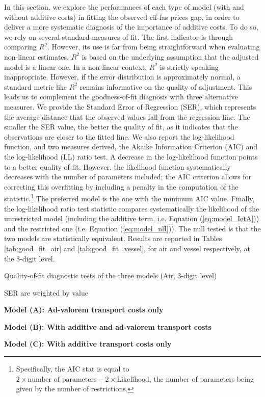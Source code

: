 \documentclass[a4paper,11pt]{article}
\begin{document}
In this section, we explore the performances of each type of model (with and without additive costs) in fitting the observed cif-fas prices gap, in order to deliver a more systematic diagnosis of the importance of additive costs.
To do so, we rely on several standard measures of fit.
The first indicator is through comparing $R^{2}$.
However, its use is far from being straightforward when evaluating non-linear estimates.
$R^2$ is based on the underlying assumption that the adjusted model is a linear one.
In a non-linear context, $R^2$ is strictly speaking inappropriate.
However, if the error distribution is approximately normal, a standard metric like $R^2$ remains informative on the quality of adjustment.
This leads us to complement the goodness-of-fit diagnosis with three alternative measures.
We provide the Standard Error of Regression (SER), which represents the average distance that the observed values fall from the regression line.
The smaller the SER value, the better the quality of fit, as it indicates that the observations are closer to the fitted line.
We also report the log-likelihood function, and two measures derived, the Akaike Information Criterion (AIC) and the log-likelihood (LL) ratio test.
A decrease in the log-likelihood function points to a better quality of fit.
However, the likelihood function systematically decreases with the number of parameters included; the AIC criterion allows for correcting this overfitting by including a penalty in the computation of the statistic.\footnote{Specifically, the AIC stat is equal to $2 \times \textrm{number of parameters} - 2 \times \textrm{Likelihood} $, the number of parameters being given by the number of restrictions.}
The preferred model is the one with the minimum AIC value.
Finally, the log-likelihood ratio test statistic compares systematically the likelihood of the unrestricted model (including the additive term, i.e.
Equation (\ref{eq:model_IetA})) and the restricted one (i.e. Equation (\ref{eq:model_nlI})).
The null tested is that the two models are statistically equivalent.
Results are reported in Tables \ref{tab:good_fit_air} and \ref{tab:good_fit_vessel}, for air and vessel respectively, at the 3-digit level.

\begin{table}[htbp]
\centering
\footnotesize{
	\caption{Quality-of-fit diagnostic tests of the three models (Air, 3-digit level)}\vspace{5mm}
	\label{tab:good_fit_air}%
	
\begin{tablenotes}
	\tiny
	\item SER are weighted by value
	\item \textbf{Model (A): Ad-valorem transport costs only}
	\item \textbf{Model (B): With additive and ad-valorem transport costs}
	\item \textbf{Model (C): With additive transport costs only}
\end{tablenotes}
}
\end{table}%
\end{document}
